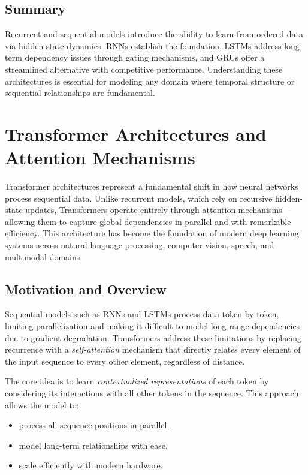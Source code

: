 \documentclass[12pt,a4paper]{report}
\begin{document}
\subsection{Summary}

Recurrent and sequential models introduce the ability to learn from ordered data via hidden-state dynamics.  
RNNs establish the foundation, LSTMs address long-term dependency issues through gating mechanisms, and GRUs offer a streamlined alternative with competitive performance.  
Understanding these architectures is essential for modeling any domain where temporal structure or sequential relationships are fundamental.

\section{Transformer Architectures and Attention Mechanisms}

Transformer architectures represent a fundamental shift in how neural networks process sequential data. 
Unlike recurrent models, which rely on recursive hidden-state updates, Transformers operate entirely through attention mechanisms—allowing them to capture global dependencies in parallel and with remarkable efficiency.  
This architecture has become the foundation of modern deep learning systems across natural language processing, computer vision, speech, and multimodal domains.

\vspace{1em}
\subsection{Motivation and Overview}

Sequential models such as RNNs and LSTMs process data token by token, limiting parallelization and making it difficult to model long-range dependencies due to gradient degradation.  
Transformers address these limitations by replacing recurrence with a \textit{self-attention} mechanism that directly relates every element of the input sequence to every other element, regardless of distance.

The core idea is to learn \textit{contextualized representations} of each token by considering its interactions with all other tokens in the sequence.  
This approach allows the model to:
\begin{itemize}
    \item process all sequence positions in parallel,
    \item model long-term relationships with ease,
    \item scale efficiently with modern hardware.
\end{itemize}
\end{document}
